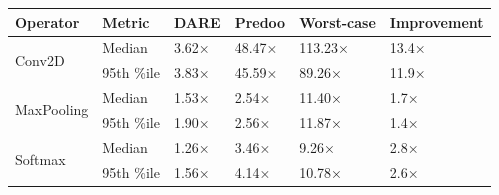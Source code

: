 \begin{tabular}{llllll}
\toprule
Operator & Metric & DARE & Predoo & Worst-case & Improvement \\
\midrule
\multirow{2}{*}{Conv2D} & Median & 3.62× & 48.47× & 113.23× & 13.4× \\
 & 95th \%ile & 3.83× & 45.59× & 89.26× & 11.9× \\
\multirow{2}{*}{MaxPooling} & Median & 1.53× & 2.54× & 11.40× & 1.7× \\
 & 95th \%ile & 1.90× & 2.56× & 11.87× & 1.4× \\
\multirow{2}{*}{Softmax} & Median & 1.26× & 3.46× & 9.26× & 2.8× \\
 & 95th \%ile & 1.56× & 4.14× & 10.78× & 2.6× \\
\bottomrule
\end{tabular}
